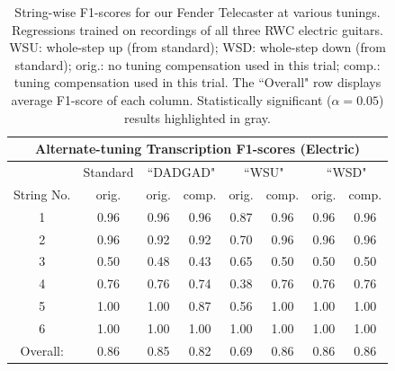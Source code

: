\documentclass[12pt]{cmuthesis}
\begin{document}
\begin{table}[!htbp]
\begin{center}
\begin{tabular}{||c||c||c|c||c|c||c|c||}
\hline
\multicolumn{8}{|c|}{\bf{Alternate-tuning Transcription F1-scores (Electric)}} \\
\hline
& Standard & \multicolumn{2}{|c|}{``DADGAD"} & \multicolumn{2}{|c|}{``WSU"} & \multicolumn{2}{|c|}{``WSD"} \\
\hline
String No. & orig. & orig. & comp. & orig. & comp. & orig. & comp. \\
\hline
1 & 0.96 & 0.96 & 0.96 & 0.87 & 0.96 & 0.96 & 0.96 \\
\hline
2 & 0.96 & 0.92 & 0.92 & 0.70 & 0.96 & 0.96 & 0.96\\
\hline
3 & 0.50 & 0.48 & 0.43 & 0.65 & 0.50 & 0.50 & 0.50\\
\hline
4 & 0.76 & 0.76 & 0.74 & 0.38 & 0.76 & 0.76 & 0.76 \\
\hline
5 & 1.00 & 1.00 & 0.87 & 0.56 & 1.00 & 1.00 & 1.00 \\
\hline
6 & 1.00 & 1.00 & 1.00 & 1.00 & 1.00 & 1.00 & 1.00\\ 
\hline
\hline
Overall: & 0.86 & 0.85 & 0.82 &  \cellcolor[gray]{0.8}0.69 & \cellcolor[gray]{0.8}0.86 & 0.86 & 0.86\\
\hline
\end{tabular}
\caption{String-wise F1-scores for our Fender Telecaster at various tunings. Regressions trained on recordings of all three RWC electric guitars. WSU: whole-step up (from standard); WSD: whole-step down (from standard); orig.: no tuning compensation used in this trial; comp.: tuning compensation used in this trial. The ``Overall" row displays average F1-score of each column. Statistically significant ($\alpha=0.05$) results highlighted in gray.} 
\label{tab:resultsTune}
\end{center}
\end{table}
\end{document}
